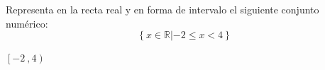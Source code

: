 \documentclass[addpoints,spanish, 12pt,a4paper]{exam}
\begin{document}
\begin{questions}
\addpoints

\question[2] Representa en la recta real y en forma de intervalo el siguiente conjunto numérico:
\addpoints %
$$\left\{ x \in \mathbb{R} \left| -2 \leqslant x < 4 \right. \right\}$$

\begin{solution}
$\left[-2 \ , 4\right)$ 
\end{solution}


\end{questions}
\end{document}
